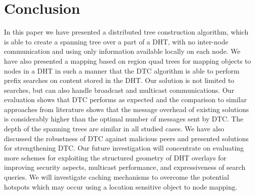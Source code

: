 \documentclass[fleqn,12pt,twoside]{article}
\begin{document}
\section{Conclusion}
\label{sec:conclusion}

In this paper we have presented a distributed tree construction
algorithm, which is able to create a spanning tree over a part of a
DHT, with no inter-node communication and using only information
available locally on each node. We have also presented a mapping based
on region quad trees for mapping objects to nodes in a DHT in such a
manner that the DTC algorithm is able to perform prefix searches on
content stored in the DHT. Our solution is not limited to searches,
but can also handle broadcast and multicast communications. Our
evaluation shows that DTC performs as expected and the comparison to
similar approaches from literature shows that the message overhead of
existing solutions is considerably higher than the optimal number of
messages sent by DTC. The depth of the spanning trees are similar in
all studied cases. We have also discussed the robustness of DTC
against malicious peers and presented solutions for strengthening DTC.  
Our future investigation will concentrate on evaluating more schemes
for exploiting the structured geometry of DHT overlays for improving
security aspects, multicast performance, and expressiveness of search
queries. We will investigate caching mechanisms to overcome the
potential hotspots which may occur using a location sensitive object
to node mapping.






\end{document}
